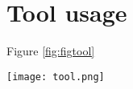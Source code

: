 \chapter{Tool usage}
Figure \ref{fig:figtool}
\begin{figure*}[h]
\centering
\texttt{[image: tool.png]}
\caption{User interface}
\label{fig:figtool}
\end{figure*}
